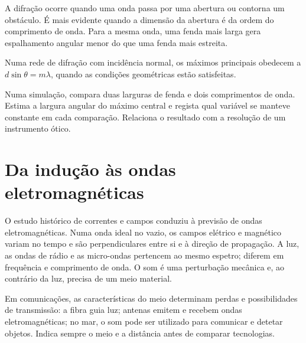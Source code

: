 \documentclass[11pt,a4paper,oneside]{book}
\begin{document}
A difração ocorre quando uma onda passa
por uma abertura ou contorna um obstáculo.
É mais evidente quando a dimensão da
abertura é da ordem do comprimento de onda.
Para a mesma onda, uma fenda mais larga
gera espalhamento angular menor do que
uma fenda mais estreita.
\begin{center}
\end{center}
Numa rede de difração com incidência normal,
os máximos principais obedecem a
$d\sin\theta=m\lambda$, quando as condições
geométricas estão satisfeitas.
\begin{stem}
Numa simulação, compara duas larguras de
fenda e dois comprimentos de onda.
Estima a largura angular do máximo central
e regista qual variável se manteve constante
em cada comparação. Relaciona o resultado
com a resolução de um instrumento ótico.
\end{stem}

\section{Da indução às ondas eletromagnéticas}
O estudo histórico de correntes e campos
conduziu à previsão de ondas eletromagnéticas.
Numa onda ideal no vazio, os campos elétrico
e magnético variam no tempo e são
perpendiculares entre si e à direção de
propagação. A luz, as ondas de rádio e as
micro-ondas pertencem ao mesmo espetro;
diferem em frequência e comprimento de onda.
O som é uma perturbação mecânica e, ao
contrário da luz, precisa de um meio material.

Em comunicações, as características do meio
determinam perdas e possibilidades de
transmissão: a fibra guia luz; antenas emitem
e recebem ondas eletromagnéticas; no mar,
o som pode ser utilizado para comunicar
e detetar objetos. Indica sempre o meio
e a distância antes de comparar tecnologias.
\end{document}
